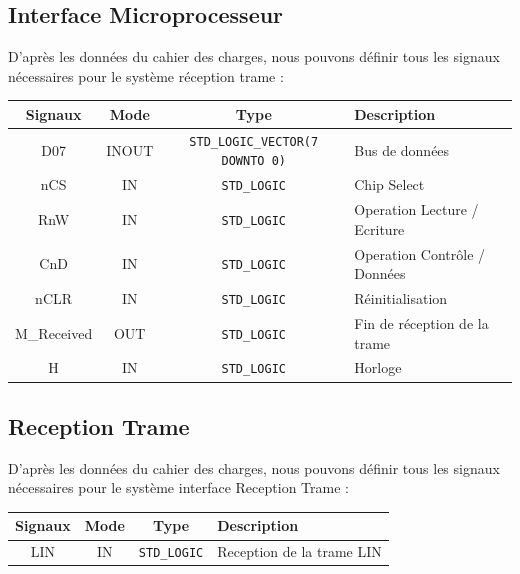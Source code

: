 \subsection{Interface Microprocesseur}

D'après les données du cahier des charges, nous pouvons définir tous les signaux nécessaires pour 
le système réception trame : 

\begin{center}
\renewcommand{\arraystretch}{1.2} %
\small %
\begin{tabularx}{\textwidth}{|c||c|c|X|}
    \hline			
    \textbf{Signaux} & \textbf{Mode} & \textbf{Type} & \textbf{Description}  \\ \hline 
    D07 & INOUT & \texttt{STD\_LOGIC\_VECTOR(7 DOWNTO 0)} & Bus de données \\
    nCS & IN & \texttt{STD\_LOGIC} & Chip Select \\
    RnW & IN & \texttt{STD\_LOGIC} & Operation Lecture / Ecriture \\
    CnD & IN & \texttt{STD\_LOGIC} & Operation Contrôle / Données \\
    nCLR & IN & \texttt{STD\_LOGIC} & Réinitialisation \\
    M\_Received & OUT & \texttt{STD\_LOGIC} & Fin de réception de la trame \\
    H & IN & \texttt{STD\_LOGIC} & Horloge \\
    \hline  
\end{tabularx}
\end{center}


\subsection{Reception Trame}

D'après les données du cahier des charges, nous pouvons définir tous les signaux nécessaires pour le système interface Reception Trame : 

\begin{center}
\renewcommand{\arraystretch}{1.2} %
\small %
\begin{tabularx}{\textwidth}{|c||c|c|X|}
    \hline			
    \textbf{Signaux} & \textbf{Mode} & \textbf{Type} & \textbf{Description}  \\ \hline 
    LIN & IN & \texttt{STD\_LOGIC} & Reception de la trame LIN \\
    \hline  
\end{tabularx}
\end{center}

